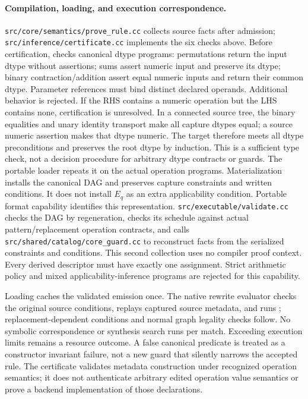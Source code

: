 \paragraph{Compilation, loading, and execution correspondence.}
\nolinkurl{src/core/semantics/prove_rule.cc} collects source facts after
admission; \nolinkurl{src/inference/certificate.cc} implements the six
checks above. Before certification,  checks canonical dtype
programs: permutations return the input dtype without assertions; sums
assert numeric input and preserve its dtype; binary contraction/addition
assert equal numeric inputs and return their common dtype. Parameter
references must bind distinct declared operands. Additional behavior is
rejected. If the RHS contains a numeric operation but the LHS contains
none, certification is unresolved. In a connected source tree, the binary
equalities and unary identity transport make all capture dtypes equal; a
source numeric assertion makes that dtype numeric. The target therefore
meets all dtype preconditions and preserves the root dtype by induction.
This is a sufficient type check, not a decision procedure for arbitrary
dtype contracts or guards. The portable loader repeats it on the actual
operation programs. Materialization installs the canonical DAG and preserves
capture constraints and written conditions. It does not install $E_q$ as
an extra applicability condition. Portable format capability
 identifies this representation.
\nolinkurl{src/executable/validate.cc} checks the DAG by regeneration,
checks its schedule against actual pattern/replacement operation contracts,
and calls \nolinkurl{src/shared/catalog/core_guard.cc} to reconstruct facts
from the serialized constraints and conditions. This second collection
uses no compiler proof context. Every derived descriptor must have exactly
one assignment. Strict arithmetic policy and mixed applicability-inference
programs are rejected for this capability.

Loading caches the validated emission once. The native rewrite evaluator
checks the original source conditions, replays captured source metadata,
and runs ; replacement-dependent conditions and normal
graph legality checks follow. No symbolic correspondence or synthesis
search runs per match. Exceeding execution limits remains a resource
outcome. A false canonical predicate is treated as a constructor invariant
failure, not a new guard that silently narrows the accepted rule.
The certificate validates metadata construction under recognized operation
semantics; it does not authenticate arbitrary edited operation value
semantics or prove a backend implementation of those declarations.
